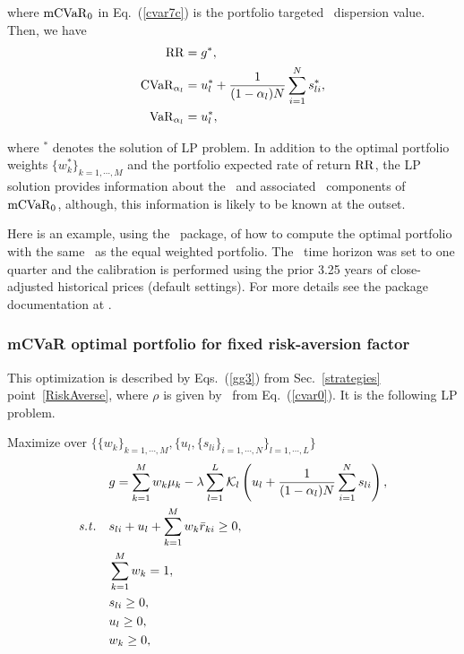 \noindent where ${\rm mCVaR}_0$ in Eq.~(\ref{cvar7c}) is the portfolio targeted \mCVaR\ dispersion value.
Then, we have
\begin{subequations}\label{cvar8}
\begin{align}
    \RR &= g^*, \label{cvar8a} \\
    \CVaR_{\alpha_l} &= u_l^* + \frac{1}{(1-\alpha_l) N}\sum_{i=1}^N s_{li}^*, \label{cavr8b} \\
    \VaR_{\alpha_l} &= u_l^*, \label{cvar8c}
\end{align}
\end{subequations}

\noindent where $^*$ denotes the solution of LP problem.
In addition to the optimal portfolio weights $\{w_k^*\}_{k=1,\cdots,M}$ and the portfolio expected rate of return ${\rm RR}$,
the LP solution provides information about the \CVaR\ and associated \VaR\ components of ${\rm mCVaR}_0$,
although, this information is likely to be known at the outset.

\bigskip
\noindent Here is an example, using the \azapy\ package, of how to compute the optimal portfolio
with the same \mCVaR\ as the equal weighted portfolio.
The \mCVaR\ time horizon was set to one quarter and the calibration is performed using the prior 3.25 years of
close-adjusted historical prices (default settings).
For more details see the package documentation at \azapydoc.



\BackToContents

\subsubsection{mCVaR optimal portfolio for fixed risk-aversion factor}
This optimization is described by Eqs.~(\ref{gg3}) from Sec.~\ref{strategies} point~\ref{RiskAverse},
where $\rho$ is given by \mCVaR\ from Eq.~(\ref{cvar0}).
It is the following LP problem.

\bigskip
\noindent Maximize over $\{\{w_k\}_{k=1,\cdots,M}, \{ u_l, \{s_{li}\}_{i=1,\cdots,N}\}_{l=1,\cdots,L}\}$
\begin{subequations}\label{cvar9}
\begin{align}
    &g = \sum_{k=1}^M w_k \mu_k - \lambda \sum_{l=1}^{L}\cK_l \left( u_l + \frac{1}{(1-\alpha_l)N} \sum_{i=1}^N s_{li} \right), \label{cvar9a} \\
    \st &s_{li} + u_l + \sum_{k=1}^M w_k \br_{ki} \geq 0, \label{cvar9b} \\
        &\sum_{k=1}^M w_k = 1, \label{cvar9c} \\
        & s_{li} \geq 0, \label{cvar9d} \\
        & u_l \geq 0, \label{cvar9e} \\
        & w_k \geq 0, \label{cvar9f}
\end{align}
\end{subequations}

